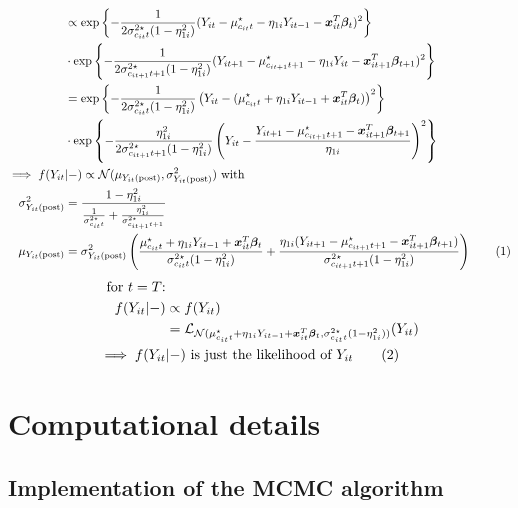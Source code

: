 \documentclass[12pt,	%
	a4paper,		%
	twoside,		%
	openright,		%
	titlepage,%
	]{book}
\theoremstyle{definition}
\begin{document}
\begin{itemize}
\begin{align*}
 & \propto \expp{-\frac{1}{2\sigma^{2\star}_{c_{it}t}(1-\eta_{1i}^2)}(Y_{it}-\mu^\star_{c_{it}t} - \eta_{1i}Y_{it-1} - \vec{x}_{it}^T\vec{\beta}_t)^2} \\ & \cdot \expp{-\frac{1}{2\sigma^{2\star}_{c_{it+1}t+1}(1-\eta_{1i}^2)}(Y_{it+1}-\mu^\star_{c_{it+1}t+1} - \eta_{1i}Y_{it} - \vec{x}_{it+1}^T\vec{\beta}_{t+1})^2} \\ 
 & = \expp{-\frac{1}{2\sigma^{2\star}_{c_{it}t}(1-\eta_{1i}^2)}\left( Y_{it}-(\mu^\star_{c_{it}t} + \eta_{1i}Y_{it-1} + \vec{x}_{it}^T\vec{\beta}_t) \right)^2} \\ & \cdot \expp{-\frac{\eta_{1i}^2}{2\sigma^{2\star}_{c_{it+1}t+1}(1-\eta_{1i}^2)}\left( Y_{it} - \frac{Y_{it+1}-\mu^\star_{c_{it+1}t+1} - \vec{x}_{it+1}^T\vec{\beta}_{t+1}}{\eta_{1i}}\right)^2} \\
%
 \implies f(Y_{it}&|-)\propto \text{$\N(\mu_{\postp{Y_{it}}},\sigma^2_{\postp{Y_{it}}})$ with}\\
\sigma^2_{\postp{Y_{it}}}&= \frac{1-\eta_{1i}^2}{\frac{1}{\sigma^{2\star}_{c_{it}t}} + \frac{\eta_{1i}^2}{\sigma^{2\star}_{c_{it+1}t+1}}}\\
\mu_{\postp{Y_{it}}}&=  \sigma^2_{\postp{Y_{it}}} \left( \frac{\mu^\star_{c_{it}t} + \eta_{1i}Y_{it-1} 
 + \vec{x}_{it}^T\vec{\beta}_t}{\sigma^{2\star}_{c_{it}t}(1-\eta_{1i}^2)} + \frac{\eta_{1i}(Y_{it+1}-\mu^\star_{c_{it+1}t+1} - \vec{x}_{it+1}^T\vec{\beta}_{t+1})}{\sigma^{2\star}_{c_{it+1}t+1}(1-\eta_{1i}^2)} \right)
\tag{\stepcounter{equation}\theequation}
\end{align*}
\begin{align*}
\text{for $t=T$:}&\\ 
  f(Y_{it} |- ) & \propto  f(Y_{it})\\
  &= \law_{\mathcal{N}(\mu_{c_{it}t}^\star+\eta_{1i}Y_{it-1} + \vec{x}_{it}^T\vec{\beta}_t,\sigma^{2\star}_{c_{it}t}(1-\eta_{1i}^2))}(Y_{it}) \\
   \implies f(Y_{it}&|-)\text{ is just the likelihood of $Y_{it}$}
\tag{\stepcounter{equation}\theequation}
\end{align*}

\end{itemize}



\chapter{Computational details}
\label{app: computational details}


\section{Implementation of the MCMC algorithm}
\end{document}
